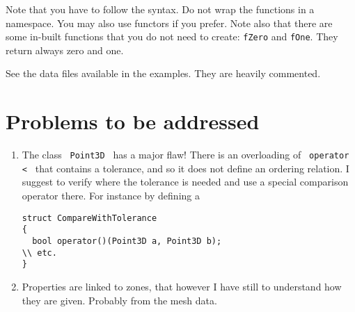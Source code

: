 \documentclass{article}
\newcommand{\li}{\lstinline}
\newcommand{\cpp}[1]{\li! #1 !}
\begin{document}
Note that you have to follow the syntax. Do not wrap the functions in a namespace. You may also use functors if you prefer. Note also that there are some in-built functions that you do not need to create: \li!fZero! and \li!fOne!. They return always zero and one.

See the data files available in the examples. They are heavily commented.

\section{Problems to be addressed}
\begin{enumerate}
\item The class \cpp{Point3D} has a major flaw! There is an overloading of \cpp{operator <} that contains a tolerance, and so it does not define
an ordering relation. I suggest to verify where the tolerance is needed and use a special comparison operator there. For instance by defining a
\begin{lstlisting}
struct CompareWithTolerance
{
  bool operator()(Point3D a, Point3D b);
\\ etc.
}
\end{lstlisting}
\item Properties are linked to zones, that however I have still to understand how they are given. Probably from the mesh data.
\end{enumerate}
\end{document}
